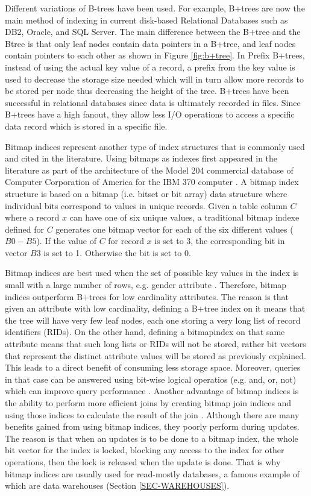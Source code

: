 \documentclass[12pt,a4paper]{article}
\begin{document}
Different variations of B-trees have been used. For example, B+trees are now the main method of indexing in current disk-based Relational Databases
\cite{lightstone2007physical} such as DB2, Oracle, and SQL Server. The main difference between the B+tree and the Btree is that only leaf nodes contain data
pointers in a B+tree, and leaf nodes contain pointers to each other as shown in Figure \ref{fig:b+tree}. In Prefix B+trees, instead of using the actual key
value of a record, a prefix from the key value is used to decrease the storage size needed which will in turn allow more records to be stored per node thus
decreasing the height of the tree. B+trees have been successful in relational databases since data is ultimately recorded in files. Since B+trees have a high
fanout, they allow less I/O operations to access a specific data record which is stored in a specific file.

Bitmap indices represent another type of index structures that is commonly used and cited in the literature. Using bitmaps as indexes first appeared in the
literature as part of the architecture of the Model 204 commercial database of Computer Corporation of America for the IBM 370 computer \cite{patrick1987model}.
A bitmap index structure is based on a bitmap (i.e. bitset or bit array) data structure where individual bits correspond to values in unique records. Given a
table column $C$ where a record $x$ can have one of six unique values, a traditional bitmap indexe defined for $C$ generates one bitmap vector for each of the
six different values ($B0-B5$). If the value of $C$ for record $x$ is set to 3, the corresponding bit in vector $B3$ is set to 1. Otherwise the bit is set to 0.

Bitmap indices are best used when the set of possible key values in the index is small with a large number of rows, e.g. gender attribute \cite{212001}.
Therefore, bitmap indices outperform B+trees for low cardinality attributes. The reason is that given an attribute with low cardinality, defining a B+tree index
on it means that the tree will have very few leaf nodes, each one storing a very long list of record identifiers (RIDs). On the other hand, defining a
bitmapindex on that same attribute means that such long lists or RIDs will not be stored, rather bit vectors that represent the distinct attribute values will
be stored as previously explained. This leads to a direct benefit of consuming less storage space. Moreover, queries in that case can be answered using bit-wise
logical operatios (e.g. and, or, not) which can improve query performance \cite{253268}. Another advantage of bitmap indices is the ability to perform more
efficient joins by creating bitmap join indices and using those indices to calculate the result of the join \cite{212001}. Although there are many benefits
gained from using bitmap indices, they poorly perform during updates. The reason is that when an updates is to be done to a bitmap index, the whole bit vector
for the index is locked, blocking any access to the index for other operations, then the lock is released when the update is done. That is why bitmap indices
are usually used for read-mostly databases, a famous example of which are data warehouses (Section \ref{SEC-WAREHOUSES}).
\end{document}
